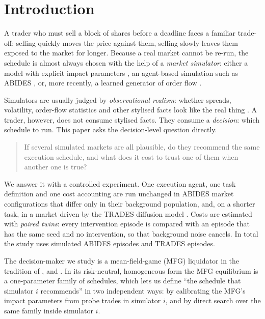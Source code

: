 \section{Introduction}

A trader who must sell a block of shares before a deadline faces a familiar trade-off: selling quickly moves the price against them, selling slowly leaves them exposed to the market for longer. Because a real market cannot be re-run, the schedule is almost always chosen with the help of a \emph{market simulator}: either a model with explicit impact parameters \citep{almgren2001optimal}, an agent-based simulation such as ABIDES \citep{byrd2019abides,amrouni2021abidesgym}, or, more recently, a learned generator of order flow \citep{coletta2021towards,berti2025trades,zhang2026m3}.

Simulators are usually judged by \emph{observational realism}: whether spreads, volatility, order-flow statistics and other stylised facts look like the real thing \citep{vyetrenko2020getreal,nagy2025lobbench}. A trader, however, does not consume stylised facts. They consume a \emph{decision}: which schedule to run. This paper asks the decision-level question directly.

\begin{quote}
If several simulated markets are all plausible, do they recommend the same execution schedule, and what does it cost to trust one of them when another one is true?
\end{quote}

We answer it with a controlled experiment. One execution agent, one task definition and one cost accounting are run unchanged in \nWorlds{} ABIDES market configurations that differ only in their background population, and, on a shorter task, in a market driven by the TRADES diffusion model \citep{berti2025trades}. Costs are estimated with \emph{paired twins}: every intervention episode is compared with an episode that has the same seed and no intervention, so that background noise cancels. In total the study uses \nEpisodes{} simulated ABIDES episodes and \nTradesEpisodes{} TRADES episodes.

The decision-maker we study is a mean-field-game (MFG) liquidator in the tradition of \citet{cardaliaguet2018mean}, \citet{huang2019mean} and \citet{casgrain2020mean}. In its risk-neutral, homogeneous form the MFG equilibrium is a one-parameter family of schedules, which lets us define ``the schedule that simulator $i$ recommends'' in two independent ways: by calibrating the MFG's impact parameters from probe trades in simulator $i$, and by direct search over the same family inside simulator $i$.

